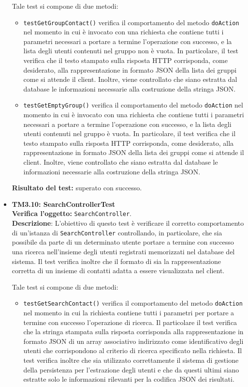 \begin{itemize}
Tale test si compone di due metodi:
\begin{itemize}

\item \texttt{testGetGroupContact()} verifica il comportamento del metodo \texttt{doAction} nel momento in cui è invocato con una richiesta che contiene tutti i parametri necessari a portare a termine l'operazione con successo, e la lista degli utenti contenuti nel gruppo non è vuota. In particolare, il test verifica che il testo stampato sulla risposta HTTP corrisponda, come desiderato, alla rappresentazione in formato JSON della lista dei gruppi come si attende il client. Inoltre, viene controllato che siano estratta dal database le informazioni necessarie alla costruzione della stringa JSON.

\item \texttt{testGetEmptyGroup()} verifica il comportamento del metodo \texttt{doAction} nel momento in cui è invocato con una richiesta che contiene tutti i parametri necessari a portare a termine l'operazione con successo, e la lista degli utenti contenuti nel gruppo è vuota. In particolare, il test verifica che il testo stampato sulla risposta HTTP corrisponda, come desiderato, alla rappresentazione in formato JSON della lista dei gruppi come si attende il client. Inoltre, viene controllato che siano estratta dal database le informazioni necessarie alla costruzione della stringa JSON.
\end{itemize}
\textbf{Risultato del test:} superato con successo.


\item \textbf{TM3.10: SearchControllerTest}\\
\textbf{Verifica l'oggetto:} \texttt{SearchController}.\\
\textbf{Descrizione}: L'obiettivo di questo test è verificare il corretto comportamento di un'istanza di \texttt{SearchController} controllando, in particolare, che sia possibile da parte di un determinato utente portare a termine con successo una ricerca nell'insieme degli utenti registrati memorizzati nel database del sistema. Il test verifica inoltre che il formato di  sia la rappresentazione corretta di un insieme di contatti adatta a essere visualizzata nel client.

Tale test si compone di due metodi:
\begin{itemize}

\item \texttt{testGetSearchContact()} verifica il comportamento del metodo \texttt{doAction} nel momento in cui la richiesta contiene tutti i parametri per portare a termine con successo l'operazione di ricerca. Il particolare il test verifica che la stringa stampata sulla risposta corrisponda alla rappresentazione in formato JSON di un array associativo indirizzato come identificativo degli utenti che corrispondono al criterio di ricerca specificato nella richiesta. Il test verifica inoltre che sia utilizzato correttamente il sistema di gestione della persistenza per l'estrazione degli utenti e che da questi ultimi siano estratte solo le informazioni rilevanti per la codifica JSON dei risultati.


\end{itemize}
\end{itemize}
